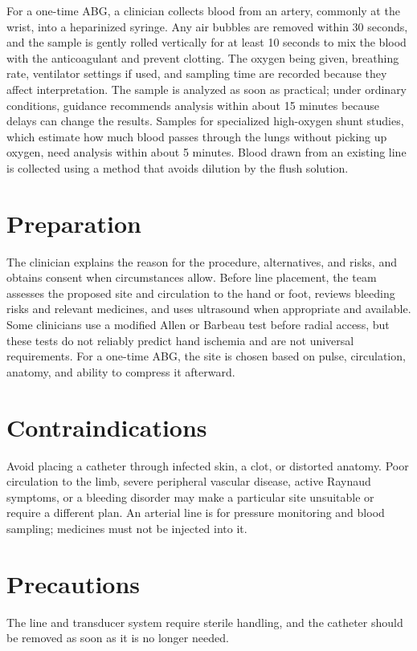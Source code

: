 For a one-time ABG, a clinician collects blood from an artery, commonly at the wrist, into a heparinized syringe. Any air bubbles are removed within 30 seconds, and the sample is gently rolled vertically for at least 10 seconds to mix the blood with the anticoagulant and prevent clotting. The oxygen being given, breathing rate, ventilator settings if used, and sampling time are recorded because they affect interpretation. The sample is analyzed as soon as practical; under ordinary conditions, guidance recommends analysis within about 15 minutes because delays can change the results. Samples for specialized high-oxygen shunt studies, which estimate how much blood passes through the lungs without picking up oxygen, need analysis within about 5 minutes. Blood drawn from an existing line is collected using a method that avoids dilution by the flush solution.

\section*{Preparation}
The clinician explains the reason for the procedure, alternatives, and risks, and obtains consent when circumstances allow. Before line placement, the team assesses the proposed site and circulation to the hand or foot, reviews bleeding risks and relevant medicines, and uses ultrasound when appropriate and available. Some clinicians use a modified Allen or Barbeau test before radial access, but these tests do not reliably predict hand ischemia and are not universal requirements. For a one-time ABG, the site is chosen based on pulse, circulation, anatomy, and ability to compress it afterward.

\section*{Contraindications}
Avoid placing a catheter through infected skin, a clot, or distorted anatomy. Poor circulation to the limb, severe peripheral vascular disease, active Raynaud symptoms, or a bleeding disorder may make a particular site unsuitable or require a different plan. An arterial line is for pressure monitoring and blood sampling; medicines must not be injected into it.

\section*{Precautions}
The line and transducer system require sterile handling, and the catheter should be removed as soon as it is no longer needed.


